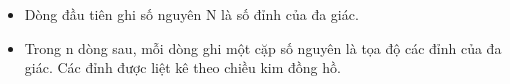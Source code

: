 \begin{itemize}
	\item     Dòng đầu tiên ghi số nguyên N là số đỉnh của đa giác.   
	\item     Trong n dòng sau, mỗi dòng ghi một cặp số nguyên là tọa độ các đỉnh của đa giác. Các đỉnh được liệt kê theo chiều kim đồng hồ.   
\end{itemize}